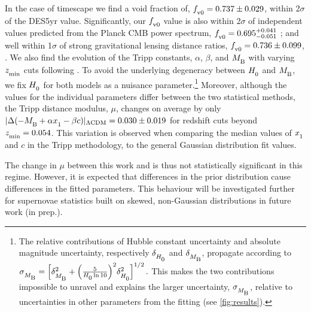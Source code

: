 \documentclass[fleqn,usenatbib]{mnras}
\newcommand{\Z}[1]{_{\lower2pt\hbox{$\scriptstyle#1$}}}
\newcommand{\Ns}[1]{_{\lower2pt\hbox{$\scriptstyle\rm#1$}}}
\newcommand{\Hn}{H\Z0}
\begin{document}
In the case of timescape we find a void fraction of, $f\Ns{v0} = 0.737 \pm 0.029$, within 2$\sigma$ of the \citet{Camilleri_2024} DES5yr value. Significantly, our $f\Ns{v0}$ value is also within 2$\sigma$ of independent values predicted from the Planck CMB power spectrum, $f\Ns{v0} = 0.695^{+0.041}_{-0.051}$ \citep{Duley_2013}; and well within 1$\sigma$ of strong gravitational lensing distance ratios, $f\Ns{v0} = 0.736 \pm 0.099$, \citep{HarveyHawes_2024}. We also find the evolution of the Tripp constants, $\alpha$, $\beta$, and $M\Ns{B}$ with varying $z\Ns{min}$ cuts following \citet{Dam_2017, Lane_2023}. To avoid the underlying degeneracy between $\Hn$ and $M\Ns{B}$, we fix $\Hn$ for both models as a nuisance parameter.\footnote{The relative contributions of Hubble constant uncertainty and absolute magnitude uncertainty, respectively $\delta\Z{\Hn}$ and $\delta\Z{M\Ns{B}}$, propagate according to
  $ \sigma\Z{M\Ns{B}} = \Bigl[\delta\Z{M\Ns{B}}^2 + \Bigl( \frac{5}{\Hn \ln{10}} \Bigr)^2 \delta\Z{\Hn}^2\Bigr]^{1/2}\,.$
This makes the two contributions impossible to unravel and explains the larger uncertainty, $\sigma\Z{M\Ns{B}}$,
relative to uncertainties in other parameters from the fitting (see \cref{fig:results}).} Moreover, although the values for the individual parameters differ between the two statistical methods, the Tripp distance modulus, $\mu$, changes on average by only $| \Delta (- M \Ns{B} + \alpha x\Z1 - \beta c) |_{\rm \Lambda CDM} = 0.030 \pm 0.019$ for redshift cuts beyond $z \Ns {min}=0.054$. This variation is observed when comparing the median values of $x\Z 1$ and $c$ in the Tripp methodology, to the general Gaussian distribution fit values.

The change in $\mu$ between this work and \citet{Lane_2023} is thus not statistically significant in this regime. However, it is expected that differences in the prior distribution cause differences in the fitted parameters. This behaviour will be investigated further for supernovae statistics built on skewed, non-Gaussian distributions in future work (in prep.).
\end{document}
